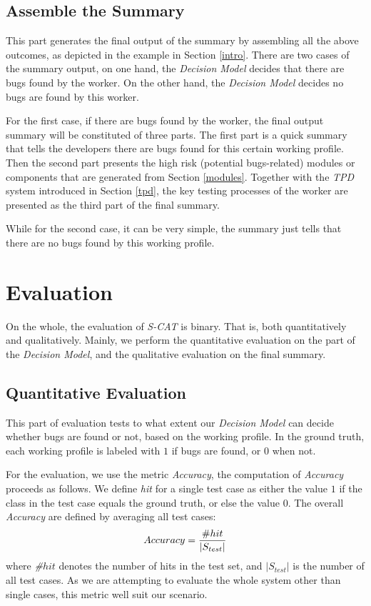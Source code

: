 \documentclass[10pt,conference]{IEEEtran}
\begin{document}
\subsection{Assemble the Summary}

This part generates the final output of the summary by assembling all the above outcomes, as depicted in the example in Section \ref{intro}.
There are two cases of the summary output, on one hand, the \emph{Decision Model} decides that there are bugs found by the worker.
On the other hand, the \emph{Decision Model} decides no bugs are found by this worker.

For the first case, if there are bugs found by the worker, the final output summary will be constituted of three parts. The first part
is a quick summary that tells the developers there are bugs found for this certain working profile. Then the second part presents
the high risk (potential bugs-related) modules or components that are generated from Section \ref{modules}. Together with the
\emph{TPD} system introduced in Section \ref{tpd}, the key testing processes of the worker are presented as the third part of the
final summary.

While for the second case, it can be very simple,
the summary just tells that there are no bugs found by this working profile.


\section{Evaluation}\label{evaluation}

On the whole, the evaluation of \emph{S-CAT} is binary. That is, both quantitatively and qualitatively.
Mainly, we perform the quantitative evaluation on the part of the \emph{Decision Model}, and the qualitative
evaluation on the final summary.

\subsection{Quantitative Evaluation}

This part of evaluation tests to what extent our \emph{Decision Model} can decide whether bugs are found or not,
based on the working profile. In the ground truth, each working profile is labeled with $1$ if bugs are found, or
$0$ when not.

For the evaluation, we use the metric \emph{Accuracy}, the computation of \emph{Accuracy} proceeds as follows.
We define \emph{hit} for a single test case as either the value $1$ if the class in the test case equals the ground truth, or else
the value $0$. The overall \emph{Accuracy} are defined by averaging all test cases:
\begin{equation}
\small
Accuracy=\frac{\#hit}{|S_{test}|}
\end{equation}
where \emph{\#$hit$} denotes the number of hits in the test set, and $|S_{test}|$ is the number of
all test cases. As we are attempting to evaluate the whole system other than single cases,
this metric well suit our scenario.
\end{document}
